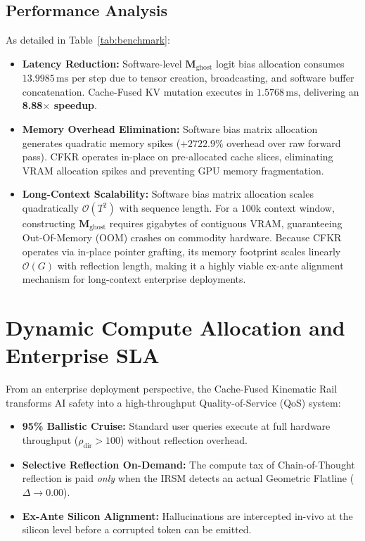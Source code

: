\documentclass[11pt,twocolumn]{article}
\begin{document}
\begin{enumerate}
\subsection{Performance Analysis}
As detailed in Table~\ref{tab:benchmark}:
\begin{itemize}
    \item \textbf{Latency Reduction:} Software-level $\mathbf{M}_{\text{ghost}}$ logit bias allocation consumes $13.9985\,\text{ms}$ per step due to tensor creation, broadcasting, and software buffer concatenation. Cache-Fused KV mutation executes in $1.5768\,\text{ms}$, delivering an \textbf{8.88$\times$ speedup}.
    \item \textbf{Memory Overhead Elimination:} Software bias matrix allocation generates quadratic memory spikes ($+2722.9\%$ overhead over raw forward pass). CFKR operates in-place on pre-allocated cache slices, eliminating VRAM allocation spikes and preventing GPU memory fragmentation.
    \item \textbf{Long-Context Scalability:} Software bias matrix allocation scales quadratically $\mathcal{O}(T^2)$ with sequence length. For a $100\text{k}$ context window, constructing $\mathbf{M}_{\text{ghost}}$ requires gigabytes of contiguous VRAM, guaranteeing Out-Of-Memory (OOM) crashes on commodity hardware. Because CFKR operates via in-place pointer grafting, its memory footprint scales linearly $\mathcal{O}(G)$ with reflection length, making it a highly viable ex-ante alignment mechanism for long-context enterprise deployments.
\end{itemize}

\section{Dynamic Compute Allocation and Enterprise SLA}
From an enterprise deployment perspective, the Cache-Fused Kinematic Rail transforms AI safety into a high-throughput Quality-of-Service (QoS) system:
\begin{itemize}
    \item \textbf{95\% Ballistic Cruise:} Standard user queries execute at full hardware throughput ($\rho_{\text{dir}} > 100$) without reflection overhead.
    \item \textbf{Selective Reflection On-Demand:} The compute tax of Chain-of-Thought reflection is paid \textit{only} when the IRSM detects an actual Geometric Flatline ($\Delta \to 0.00$).
    \item \textbf{Ex-Ante Silicon Alignment:} Hallucinations are intercepted in-vivo at the silicon level before a corrupted token can be emitted.
\end{itemize}


\end{enumerate}
\end{document}
